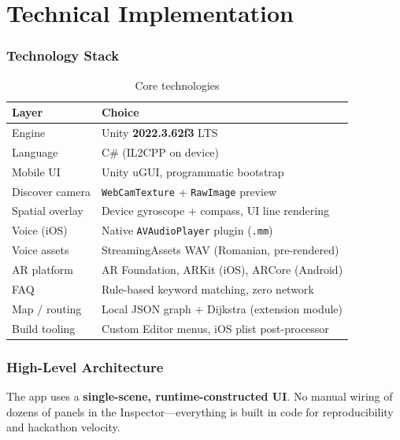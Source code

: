 \documentclass[11pt,a4paper]{article}
\begin{document}
\newpage

\part{Technical Implementation}
\label{part:technical}

\section{Technology Stack}

\begin{table}[H]
\centering
\caption{Core technologies}
\begin{tabular}{@{}ll@{}}
\toprule
\textbf{Layer} & \textbf{Choice} \\
\midrule
Engine & Unity \textbf{2022.3.62f3} LTS \\
Language & C\# (IL2CPP on device) \\
Mobile UI & Unity uGUI, programmatic bootstrap \\
Discover camera & \texttt{WebCamTexture} + \texttt{RawImage} preview \\
Spatial overlay & Device gyroscope + compass, UI line rendering \\
Voice (iOS) & Native \texttt{AVAudioPlayer} plugin (\texttt{.mm}) \\
Voice assets & StreamingAssets WAV (Romanian, pre-rendered) \\
AR platform & AR Foundation, ARKit (iOS), ARCore (Android) \\
FAQ & Rule-based keyword matching, zero network \\
Map / routing & Local JSON graph + Dijkstra (extension module) \\
Build tooling & Custom Editor menus, iOS plist post-processor \\
\bottomrule
\end{tabular}
\end{table}

\section{High-Level Architecture}

The app uses a \textbf{single-scene, runtime-constructed UI}. No manual wiring of dozens of panels in the Inspector---everything is built in code for reproducibility and hackathon velocity.
\end{document}
